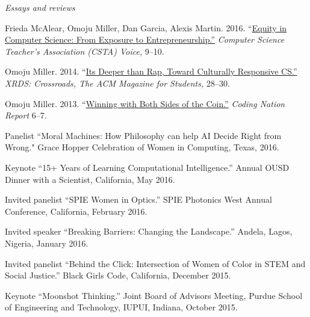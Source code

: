 \documentclass[11pt,article,oneside]{memoir}
\begin{document}
\bigskip
\noindent\emph{Essays and reviews \vspace{0.05in}}



\ind Frieda McAlear, Omoju Miller, Dan Garcia, Alexis Martin. 2016. ``\href{http://www.csta.acm.org/Communications/sub/CSTAVoice_Files/csta_voice_01_2016.pdf}{Equity in Computer Science: From Exposure to Entrepreneurship.''} \emph{Computer Science Teacher's Association (CSTA) Voice, } 9--10. 

\ind Omoju Miller. 2014. ``\href{http://dl.acm.org/citation.cfm?id=2604994}{Its Deeper than Rap, Toward Culturally Responsive CS.'' }\emph{XRDS: Crossroads,  The ACM Magazine for Students, } 28--30. 

\ind Omoju Miller. 2013. ``\href{http://kaporcenter.org/wp-content/uploads/2013/10/Kapor_CodingLandscape_R3.pdf}{Winning with Both Sides of the Coin.''} \emph{Coding Nation Report} 6--7. 
 
 \bigskip


\medskip

\ind Panelist ``Moral Machines: How Philosophy can help AI Decide Right from Wrong." Grace Hopper Celebration of Women in Computing, Texas, 2016.

\ind Keynote ``15+ Years of Learning Computational Intelligence.'' Annual OUSD Dinner with a Scientist, California, May 2016. 

\ind Invited panelist ``SPIE Women in Optics.'' SPIE Photonics West Annual Conference, California, February 2016. 

\ind Invited speaker ``Breaking Barriers: Changing the Landscape.'' Andela, Lagos, Nigeria, January 2016. 

\ind Invited panelist ``Behind the Click: Intersection of Women of Color in STEM and Social Justice.'' Black Girls Code, California, December 2015.

\ind Keynote ``Moonshot Thinking.'' Joint Board of Advisors Meeting, Purdue School of Engineering and Technology, IUPUI, Indiana, October 2015.
\end{document}
